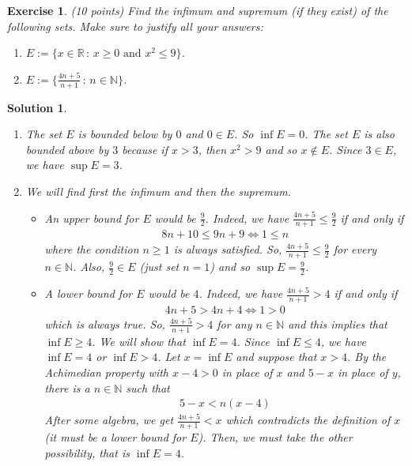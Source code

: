 \documentclass[12pt]{article}
\newcommand{\bR}{\mathbb{R}}
\newcommand{\bN}{\mathbb{N}}
\theoremstyle{plain}
\newtheorem{exer}{\textbf{Exercise}}}
\theoremstyle{plain}
\newtheorem*{sol}{\textbf{Solution}}}
\theoremstyle{plain}
\theoremstyle{plain}
\begin{document}
\begin{exer}
(10 points)
Find the infimum and supremum (if they exist) of the following sets. Make sure to justify all your answers:
	\begin{enumerate}[label=\textbf{\alph*)}]
	\item $E := \{ x \in \bR \, : \, x \geq 0 \text{ and } x^2 \leq 9 \}$.
	\item $E := \{ \frac{4n + 5}{n + 1} \, : \, n \in \bN \}$.
	\end{enumerate}
\end{exer}
\begin{sol}
\begin{enumerate}[label=\textbf{\alph*)}]
\item The set $E$ is bounded below by $0$ and $0 \in E$. So $\inf E = 0$. The set $E$ is also bounded above by $3$ because if $x > 3$, then $x^2 > 9$ and so $x \not\in E$. Since $3 \in E$, we have $\sup E = 3$.
\item We will find first the infimum and then the supremum.
	\begin{itemize}
	\item An upper bound for $E$ would be $\frac{9}{2}$. Indeed, we have $\frac{4n + 5}{n + 1} \leq \frac{9}{2}$ if and only if 
		\begin{align*}
		8n + 10 \leq 9n + 9 \iff 1 \leq n
		\end{align*}		 
	where the condition $n \geq 1$ is always satisfied. So, $\frac{4n + 5}{n + 1} \leq \frac{9}{2}$ for every $n \in \bN$. Also, $\frac{9}{2} \in E$ (just set $n= 1$) and so $\sup E = \frac{9}{2}$.
	\item A lower bound for $E$ would be $4$. Indeed, we have $\frac{4n + 5}{n + 1} > 4$ if and only if
		\begin{align*}
		4n + 5 > 4n + 4 \iff 1 > 0
		\end{align*}
	which is always true. So, $\frac{4n + 5}{n + 1} > 4$ for any $n \in \bN$ and this implies that $\inf E \geq 4$. We will show that $\inf E = 4$. Since $\inf E \leq 4$, we have $\inf E = 4$ or $\inf E > 4$. Let $x = \inf E$ and suppose that $x > 4$. By the Achimedian property with $x - 4 > 0$ in place of $x$ and $5 - x$ in place of $y$, there is a $n \in \bN$ such that
		\begin{align*}
		5 - x < n (x - 4)
		\end{align*}
	After some algebra, we get $\frac{4n + 5}{n + 1} < x$ which contradicts the definition of $x$ (it must be a lower bound for $E$). Then, we must take the other possibility, that is $\inf E = 4$.
	\end{itemize}
\end{enumerate}
\end{sol}
\end{document}
